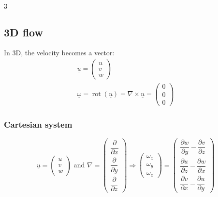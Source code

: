 \documentclass[9pt, landscape, a4paper]{article}
\DeclareMathOperator{\rot}{rot}
\begin{document}
\begin{multicols*}{3}
\subsection{3D flow}
In 3D, the velocity becomes a vector:
\begin{gather*}
  \underline{u} = \begin{pmatrix} u \\ v \\ w \end{pmatrix}\\
  \underline{\omega} = \rot(\underline{u}) = \nabla \times \underline{u} = \begin{pmatrix}
    0\\0\\0
  \end{pmatrix}
\end{gather*}

\subsubsection{Cartesian system}
\begin{equation*}
  \underline{u} =
  \begin{pmatrix}
    u\\
    v\\
    w
  \end{pmatrix}
  \text{ and }
  \nabla =
  \begin{pmatrix}
    \dfrac{\partial}{\partial x}\\[1.5ex]
    \dfrac{\partial}{\partial y}\\[1.5ex]
    \dfrac{\partial}{\partial z}
  \end{pmatrix} \Rightarrow
  \begin{pmatrix}
    \omega_x\\
    \omega_y\\
    \omega_z
  \end{pmatrix}
  =
  \begin{pmatrix}
    \dfrac{\partial w}{\partial y} - \dfrac{\partial v}{\partial z}\\[1.5ex]
    \dfrac{\partial u}{\partial z} - \dfrac{\partial w}{\partial x}\\[1.5ex]
    \dfrac{\partial v}{\partial x} - \dfrac{\partial u}{\partial y}
  \end{pmatrix}
\end{equation*}


\end{multicols*}
\end{document}
